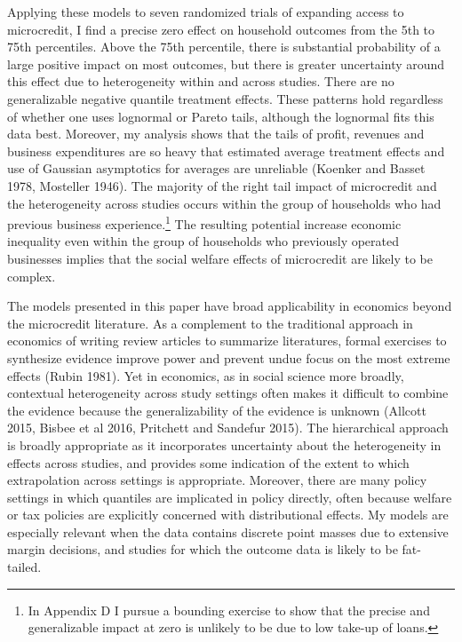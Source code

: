 \documentclass[AER]{AEA}
\begin{document}
Applying these models to seven randomized trials of expanding access to microcredit, I find a precise zero effect on household outcomes from the 5th to 75th percentiles. Above the 75th percentile, there is substantial probability of a large positive impact on most outcomes, but there is greater uncertainty around this effect due to heterogeneity within and across studies. There are no generalizable negative quantile treatment effects. These patterns hold regardless of whether one uses lognormal or Pareto tails, although the lognormal fits this data best. Moreover, my analysis shows that the tails of profit, revenues and business expenditures are so heavy that estimated average treatment effects and use of Gaussian asymptotics for averages are unreliable (Koenker and Basset 1978, Mosteller 1946). The majority of the right tail impact of microcredit and the heterogeneity across studies occurs within the group of households who had previous business experience.\footnote{In Appendix D I pursue a bounding exercise to show that the precise and generalizable impact at zero is unlikely to be due to low take-up of loans.} The resulting potential increase economic inequality even within the group of households who previously operated businesses implies that the social welfare effects of microcredit are likely to be complex.

The models presented in this paper have broad applicability in economics beyond the microcredit literature. As a complement to the traditional approach in economics of writing review articles to summarize literatures, formal exercises to synthesize evidence improve power and prevent undue focus on the most extreme effects (Rubin 1981). Yet in economics, as in social science more broadly, contextual heterogeneity across study settings often makes it difficult to combine the evidence because the generalizability of the evidence is unknown (Allcott 2015, Bisbee et al 2016, Pritchett and Sandefur 2015). The hierarchical approach is broadly appropriate as it incorporates uncertainty about the heterogeneity in effects across studies, and provides some indication of the extent to which extrapolation across settings is appropriate. Moreover, there are many policy settings in which quantiles are implicated in policy directly, often because welfare or tax policies are explicitly concerned with distributional effects. My models are especially relevant when the data contains discrete point masses due to extensive margin decisions, and studies for which the outcome data is likely to be fat-tailed. 
\end{document}
